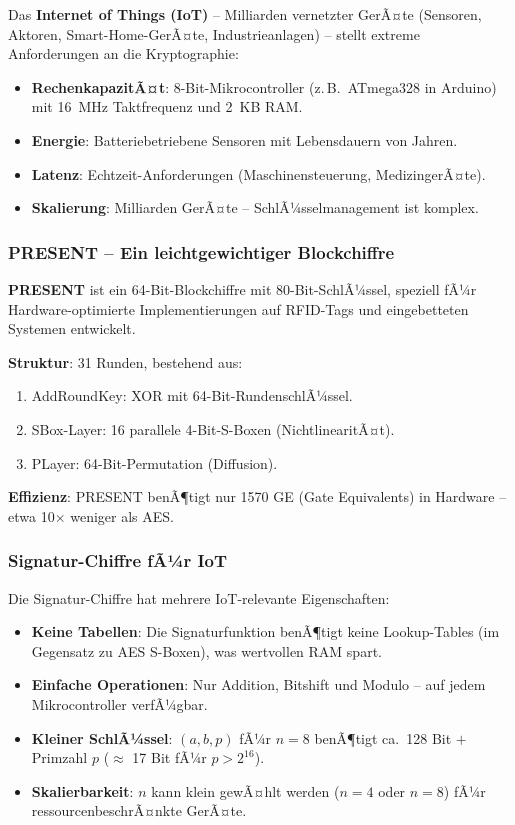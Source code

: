 ﻿\documentclass[a4paper,12pt]{scrreprt}
\theoremstyle{definition}
\begin{document}
Das \textbf{Internet of Things (IoT)} -- Milliarden vernetzter GerÃ¤te (Sensoren, Aktoren, Smart-Home-GerÃ¤te, Industrieanlagen) -- stellt extreme Anforderungen an die Kryptographie:

\begin{itemize}
    \item \textbf{RechenkapazitÃ¤t}: 8-Bit-Mikrocontroller (z.\,B.\ ATmega328 in Arduino) mit 16~MHz Taktfrequenz und 2~KB RAM.
    \item \textbf{Energie}: Batteriebetriebene Sensoren mit Lebensdauern von Jahren.
    \item \textbf{Latenz}: Echtzeit-Anforderungen (Maschinensteuerung, MedizingerÃ¤te).
    \item \textbf{Skalierung}: Milliarden GerÃ¤te -- SchlÃ¼sselmanagement ist komplex.
\end{itemize}

\subsubsection{PRESENT -- Ein leichtgewichtiger Blockchiffre}

\textbf{PRESENT} \cite{BSW07} ist ein 64-Bit-Blockchiffre mit 80-Bit-SchlÃ¼ssel, speziell fÃ¼r Hardware-optimierte Implementierungen auf RFID-Tags und eingebetteten Systemen entwickelt.

\textbf{Struktur}: 31 Runden, bestehend aus:
\begin{enumerate}
    \item AddRoundKey: XOR mit 64-Bit-RundenschlÃ¼ssel.
    \item SBox-Layer: 16 parallele 4-Bit-S-Boxen (NichtlinearitÃ¤t).
    \item PLayer: 64-Bit-Permutation (Diffusion).
\end{enumerate}

\textbf{Effizienz}: PRESENT benÃ¶tigt nur 1570 GE (Gate Equivalents) in Hardware -- etwa 10$\times$ weniger als AES.

\subsubsection{Signatur-Chiffre fÃ¼r IoT}

Die Signatur-Chiffre hat mehrere IoT-relevante Eigenschaften:
\begin{itemize}
    \item \textbf{Keine Tabellen}: Die Signaturfunktion benÃ¶tigt keine Lookup-Tables (im Gegensatz zu AES S-Boxen), was wertvollen RAM spart.
    \item \textbf{Einfache Operationen}: Nur Addition, Bitshift und Modulo -- auf jedem Mikrocontroller verfÃ¼gbar.
    \item \textbf{Kleiner SchlÃ¼ssel}: $(a, b, p)$ fÃ¼r $n=8$ benÃ¶tigt ca.\ 128 Bit $+$ Primzahl $p$ ($\approx$ 17 Bit fÃ¼r $p > 2^{16}$).
    \item \textbf{Skalierbarkeit}: $n$ kann klein gewÃ¤hlt werden ($n=4$ oder $n=8$) fÃ¼r ressourcenbeschrÃ¤nkte GerÃ¤te.
\end{itemize}
\end{document}
